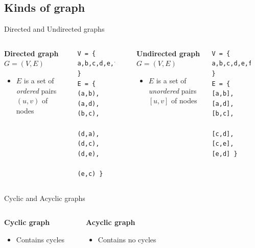 \documentclass[compress]{beamer}
\begin{document}
\subsection{Kinds of graph}
\begin{frame}[fragile]{Directed and Undirected graphs}
  \begin{columns}
  \begin{block}{\textbf{Directed graph} $G = (V, E)$}
    \begin{itemize}
      \item $E$ is a set of \emph{ordered} pairs $(u, v)$ of nodes
    \end{itemize}
  \end{block}
  \begin{verbatim}
V = { a,b,c,d,e,f }
E = { (a,b),(a,d),(b,c),
      (d,a),(d,c),(d,e),
      (e,c) }
  \end{verbatim}
  \begin{center}
  \scalebox{0.65}{}
  \end{center}
  \begin{block}{\textbf{Undirected graph} $G = (V, E)$}
    \begin{itemize}
      \item $E$ is a set of \emph{unordered} pairs $[u, v]$ of nodes
    \end{itemize}
  \end{block}
  \begin{verbatim}
V = { a,b,c,d,e,f }
E = { [a,b],[a,d],[b,c],
      [c,d],[c,e],[e,d] }

  \end{verbatim}
  \begin{center}
  \scalebox{0.65}{}
  \end{center}
\end{columns}
\end{frame}

\begin{frame}{Cyclic and Acyclic graphs}
  \begin{columns}
    \begin{block}{\textbf{Cyclic graph}}
      \begin{itemize}
        \item Contains cycles
      \end{itemize}
    \end{block}
    \begin{center}
    
  \end{center}
    \begin{block}{\textbf{Acyclic graph}}
      \begin{itemize}
        \item Contains no cycles
      \end{itemize}
    \end{block}
    \begin{center}
    
    \end{center}
  \end{columns}
\end{frame}
\end{document}
